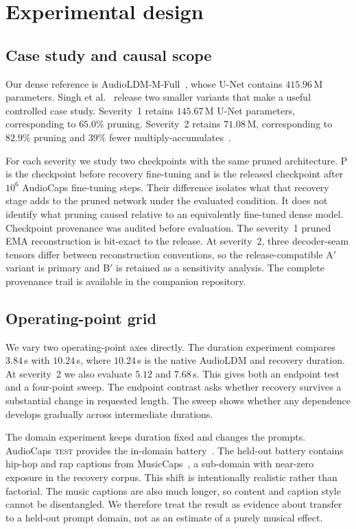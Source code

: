 \section{Experimental design}
\subsection{Case study and causal scope}
Our dense reference is AudioLDM-M-Full~\cite{liu2023audioldm}, whose U-Net contains $415.96$\,M parameters. Singh et al.~\cite{singh2026pruning} release two smaller variants that make a useful controlled case study. Severity~1 retains $145.67$\,M U-Net parameters, corresponding to $65.0\%$ pruning. Severity~2 retains $71.08$\,M, corresponding to $82.9\%$ pruning and $39\%$ fewer multiply-accumulates~\cite{singh2026pruning}.

For each severity we study two checkpoints with the same pruned architecture. P is the checkpoint before recovery fine-tuning and \PFT{} is the released checkpoint after $10^{6}$ AudioCaps fine-tuning steps. Their difference isolates what that recovery stage adds to the pruned network under the evaluated condition. It does not identify what pruning caused relative to an equivalently fine-tuned dense model. Checkpoint provenance was audited before evaluation. The severity~1 pruned EMA reconstruction is bit-exact to the release. At severity~2, three decoder-seam tensors differ between reconstruction conventions, so the release-compatible A$'$ variant is primary and B$'$ is retained as a sensitivity analysis. The complete provenance trail is available in the companion repository.

\subsection{Operating-point grid}
We vary two operating-point axes directly. The duration experiment compares $3.84$\,s with $10.24$\,s, where $10.24$\,s is the native AudioLDM and recovery duration. At severity~2 we also evaluate $5.12$ and $7.68$\,s. This gives both an endpoint test and a four-point sweep. The endpoint contrast asks whether recovery survives a substantial change in requested length. The sweep shows whether any dependence develops gradually across intermediate durations.

The domain experiment keeps duration fixed and changes the prompts. AudioCaps \textsc{test} provides the in-domain battery~\cite{kim2019audiocaps}. The held-out battery contains hip-hop and rap captions from MusicCaps~\cite{agostinelli2023musiclm}, a sub-domain with near-zero exposure in the recovery corpus. This shift is intentionally realistic rather than factorial. The music captions are also much longer, so content and caption style cannot be disentangled. We therefore treat the result as evidence about transfer to a held-out prompt domain, not as an estimate of a purely musical effect.

